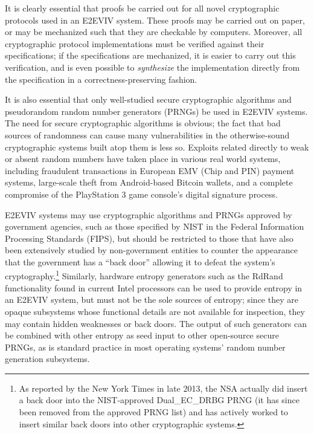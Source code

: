 It is clearly essential that proofs be carried out for all novel
cryptographic protocols used in an E2EVIV system. These proofs may be
carried out on paper, or may be mechanized such that they are
checkable by computers. Moreover, all cryptographic protocol
implementations must be verified against their specifications; if the
specifications are mechanized, it is easier to carry out this
verification, and is even possible to \emph{synthesize} the
implementation directly from the specification in a
correctness-preserving fashion.

It is also essential that only well-studied secure cryptographic
algorithms and pseudorandom random number generators (PRNGs) be used
in E2EVIV systems. The need for secure cryptographic algorithms is
obvious; the fact that bad sources of randomness can cause many
vulnerabilities in the otherwise-sound cryptographic systems built
atop them is less so. Exploits related directly to weak or absent
random numbers have taken place in various real world systems,
including fraudulent transactions in European EMV (Chip and PIN)
payment systems, large-scale theft from Android-based Bitcoin wallets,
and a complete compromise of the PlayStation 3 game console's digital
signature process.

E2EVIV systems may use cryptographic algorithms and PRNGs approved by
government agencies, such as those specified by NIST in the Federal
Information Processing Standards (FIPS), but should be restricted to
those that have also been extensively studied by non-government
entities to counter the appearance that the government has a ``back
door'' allowing it to defeat the system's cryptography.\footnote{As
  reported by the New York Times in late 2013, the NSA actually did
  insert a back door into the NIST-approved Dual\_EC\_DRBG PRNG (it
  has since been removed from the approved PRNG list) and has actively
  worked to insert similar back doors into other cryptographic
  systems.}  Similarly, hardware entropy generators such as the RdRand
functionality found in current Intel processors can be used to provide
entropy in an E2EVIV system, but must not be the sole sources of
entropy; since they are opaque subsystems whose functional details are
not available for inspection, they may contain hidden weaknesses or
back doors. The output of such generators can be combined with other
entropy as seed input to other open-source secure PRNGs, as is
standard practice in most operating systems' random number generation
subsystems.

